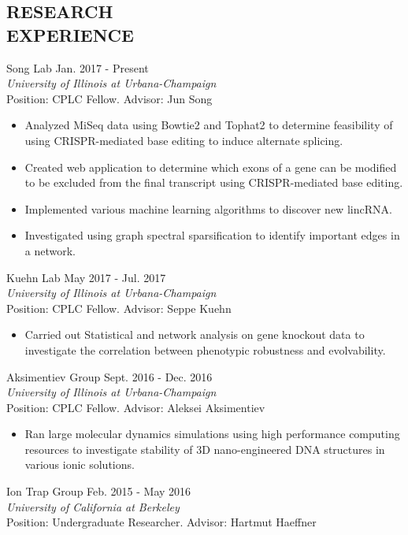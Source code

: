 \documentclass[margin, 10pt]{res} %
\begin{document}
\begin{resume}
\section{RESEARCH \\ EXPERIENCE}

Song Lab  \hfill Jan. 2017 - Present \\ {\sl University of Illinois at Urbana-Champaign}\\
{\normalfont Position: CPLC Fellow. Advisor: Jun Song}

\begin{itemize}
\item {\normalfont Analyzed MiSeq data using Bowtie2 and Tophat2 to determine feasibility of using CRISPR-mediated base editing to induce alternate splicing. }
\item {\normalfont Created web application to determine which exons of a gene can be modified to be excluded from the final transcript using CRISPR-mediated base editing.}
\item {\normalfont Implemented various machine learning algorithms to discover new lincRNA.}
\item {\normalfont Investigated using graph spectral sparsification to identify important edges in a network.}
\end{itemize}

Kuehn Lab \hfill May 2017 - Jul. 2017 \\ {\sl University of Illinois at Urbana-Champaign} \\
{\normalfont Position: CPLC Fellow. Advisor: Seppe Kuehn}

\begin{itemize}
\item {\normalfont Carried out Statistical and network analysis on gene knockout data to investigate the correlation between phenotypic robustness and evolvability.}
\end{itemize}

Aksimentiev Group \hfill Sept. 2016 - Dec. 2016\\ {\sl University of Illinois at Urbana-Champaign} \\
{\normalfont Position: CPLC Fellow. Advisor: Aleksei Aksimentiev}

\begin{itemize}
\item {\normalfont Ran large molecular dynamics simulations using high performance computing resources to investigate stability of 3D nano-engineered DNA structures in various ionic solutions.}
\end{itemize}
Ion Trap Group \hfill Feb. 2015 - May 2016\\ {\sl University of California at Berkeley} \\
{\normalfont Position: Undergraduate Researcher. Advisor: Hartmut Haeffner}


\end{resume}
\end{document}
